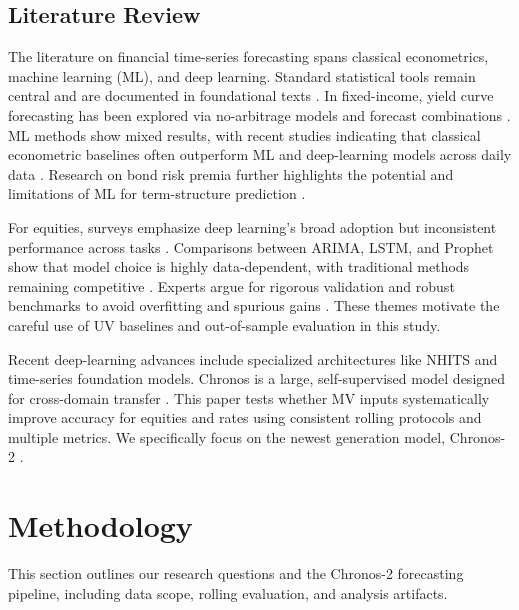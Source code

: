 \documentclass[twocolumn]{article}
\begin{document}
\subsection{Literature Review}

The literature on financial time-series forecasting spans classical econometrics, machine learning (ML), and deep learning. Standard statistical tools remain central and are documented in foundational texts \citep{shumway_time_2025}. In fixed-income, yield curve forecasting has been explored via no-arbitrage models \citep{moench_forecasting_2006} and forecast combinations \citep{caldeira_predicting_2013}. ML methods show mixed results, with recent studies indicating that classical econometric baselines often outperform ML and deep-learning models across daily data \citep{singh_yield_2025, sambasivan_statistical_2017}. Research on bond risk premia further highlights the potential and limitations of ML for term-structure prediction \citep{bianchi_bond_2020, hoogteijling_forecasting_2021}.

For equities, surveys emphasize deep learning's broad adoption but inconsistent performance across tasks \citep{sezer_financial_2019}. Comparisons between ARIMA, LSTM, and Prophet show that model choice is highly data-dependent, with traditional methods remaining competitive \citep{sunki_time_2024}. Experts argue for rigorous validation and robust benchmarks to avoid overfitting and spurious gains \citep{lopez_de_prado_advances_2018}. These themes motivate the careful use of UV baselines and out-of-sample evaluation in this study.

Recent deep-learning advances include specialized architectures like NHITS \citep{challu_nhits_2023} and time-series foundation models. Chronos is a large, self-supervised model designed for cross-domain transfer \citep{ansari_chronos_2024}. This paper tests whether MV inputs systematically improve accuracy for equities and rates using consistent rolling protocols and multiple metrics. We specifically focus on the newest generation model, Chronos-2 \citep{ansari_chronos-2_2025}.



\section{Methodology}

This section outlines our research questions and the Chronos-2 forecasting pipeline, including data scope, rolling evaluation, and analysis artifacts.
\end{document}
